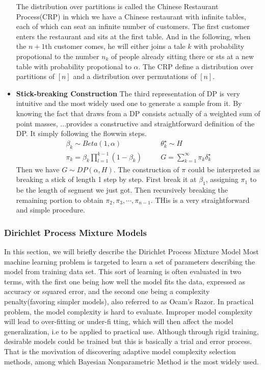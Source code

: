 \begin{itemize}
	The distribution over partitions is called the Chinese Restaurant Process(CRP) in which we have a Chinese restaurant with infinite tables, each of which can seat an infinite number of customers. The first customer enters the restaurant and sits at the first table. And in the following, when the $n+1$th customer comes, he will either joins a tale $k$ with probability propotional to the number $n_k$ of people already sitting there or sts at a new table with probability propotional to $\alpha$. The CRP define a distribution over partitions of $[n]$ and a distribution over permutations of $[n]$. 
	\item \textbf{Stick-breaking Construction} 
	The  third representation of DP is very intuitive and the most widely used one to generate a sample from it. By knowing the fact that draws from a DP consists actually of a weighted sum of point masses, ...provides a constructive and straightforward definition of the DP. It simply following the flowwin steps.
	\begin{eqnarray}
		\beta_k\sim Beta(1,\alpha)&\quad&\theta_k^\star\sim H\nonumber \\
		\pi_k=\beta_k\prod_{l=1}^{k-1}(1-\beta_k)&\quad&G=\sum_{k=1}^{\infty}\pi_k\delta_k^\star
	\end{eqnarray}
	Then we have $G\sim DP(\alpha,H)$. The construction of $\pi$ could be interpreted as breaking a stick of length 1 step by step. First break it at $\beta_1$, assigning $\pi_1$ to be the length of segment we just got. Then recursively breaking the remaining portion to obtain $\pi_2,\pi_3,\cdots,\pi_{n-1}$. THis is a very straightforward and simple procedure.
\end{itemize}   

\subsubsection{ Dirichlet Process Mixture Models}\label{bnp}
In this section, we will briefly describe the Dirichlet Process Mixture Model
Most machine learning problem is targeted to learn a set of parameters describing the model from training data set. This sort of learning is often evaluated in two terms, with the first one being how well the model fits the data, expressed as accuracy or squared error, and the second one being a complexity penalty(favoring simpler models)\cite{gershma2012tutorial,escobar1995bayesian}, also referred to as Ocam's Razor. In practical problem, the model complexity is hard to evaluate. Improper model complexity will lead to over-fitting or under-fi tting\cite{gershman2012tutorial,muller2004nonparametric}, which will then affect the model generalization, i.e to be applied to practical use. Although through rigid training, desirable models could be trained but this is basically a trial and error process\cite{hjort2010bayesian}. That is the movivation of discovering adaptive model complexity selection methods, among which Bayesian Nonparametric Method is the most widely used.

